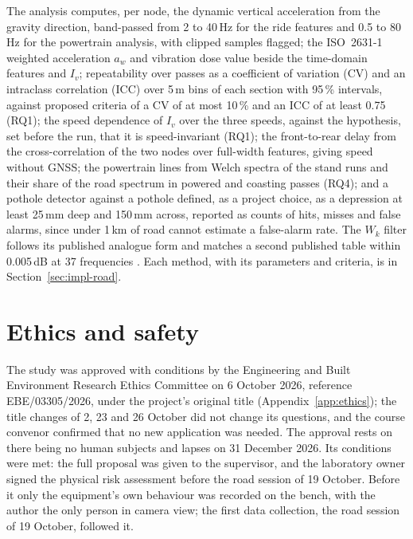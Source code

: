 The analysis computes, per node, the dynamic vertical acceleration from the gravity direction, band-passed from 2 to 40\,Hz for the ride features and 0.5 to 80\,Hz for the powertrain analysis, with clipped samples flagged; the ISO~2631-1 weighted acceleration $a_w$ and vibration dose value \cite{iso2631} beside the time-domain features and $I_v$; repeatability over passes as a coefficient of variation (CV) and an intraclass correlation (ICC) over 5\,m bins of each section with 95\,\% intervals, against proposed criteria of a CV of at most 10\,\% and an ICC of at least 0.75 (RQ1); the speed dependence of $I_v$ over the three speeds, against the hypothesis, set before the run, that it is speed-invariant (RQ1); the front-to-rear delay from the cross-correlation of the two nodes over full-width features, giving speed without GNSS; the powertrain lines from Welch spectra of the stand runs and their share of the road spectrum in powered and coasting passes (RQ4); and a pothole detector against a pothole defined, as a project choice, as a depression at least 25\,mm deep and 150\,mm across, reported as counts of hits, misses and false alarms, since under 1\,km of road cannot estimate a false-alarm rate. The $W_k$ filter follows its published analogue form \cite{rimell2007} and matches a second published table within 0.005\,dB at 37 frequencies \cite{virtins2024}. Each method, with its parameters and criteria, is in Section~\ref{sec:impl-road}.

\section{Ethics and safety}
\label{sec:ethics}

The study was approved with conditions by the Engineering and Built Environment Research Ethics Committee on 6 October 2026, reference EBE/03305/2026, under the project's original title (Appendix~\ref{app:ethics}); the title changes of 2, 23 and 26 October did not change its questions, and the course convenor confirmed that no new application was needed. The approval rests on there being no human subjects and lapses on 31 December 2026. Its conditions were met: the full proposal was given to the supervisor, and the laboratory owner signed the physical risk assessment before the road session of 19 October. Before it only the equipment's own behaviour was recorded on the bench, with the author the only person in camera view; the first data collection, the road session of 19 October, followed it.


